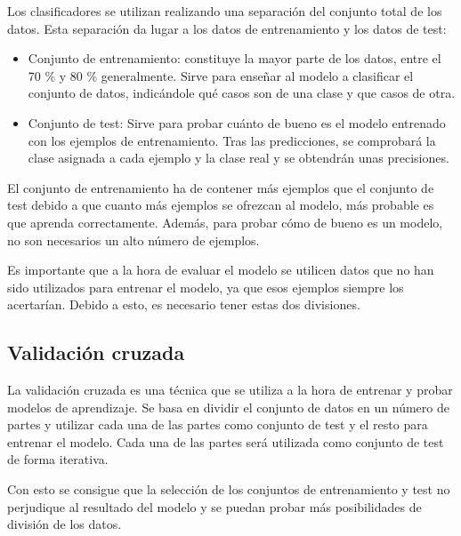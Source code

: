 Los clasificadores se utilizan realizando una separación del conjunto total de los datos. Esta separación da lugar a los datos de entrenamiento y los datos de test:

\begin{itemize}
	\item Conjunto de entrenamiento: constituye la mayor parte de los datos, entre el 70 \% y 80 \% generalmente. Sirve para enseñar al modelo a clasificar el conjunto de datos, indicándole qué casos son de una clase y que casos de otra.
	\item Conjunto de test: Sirve para probar cuánto de bueno es el modelo entrenado con los ejemplos de entrenamiento. Tras las predicciones, se comprobará la clase asignada a cada ejemplo y la clase real y se obtendrán unas precisiones.
\end{itemize}

El conjunto de entrenamiento ha de contener más ejemplos que el conjunto de test debido a que cuanto más ejemplos se ofrezcan al modelo, más probable es que aprenda correctamente. Además, para probar cómo de bueno es un modelo, no son necesarios un alto número de ejemplos.

Es importante que a la hora de evaluar el modelo se utilicen datos que no han sido utilizados para entrenar el modelo, ya que esos ejemplos siempre los acertarían. Debido a esto, es necesario tener estas dos divisiones.

\subsection{Validación cruzada}
La validación cruzada es una técnica que se utiliza a la hora de entrenar y probar modelos de aprendizaje. Se basa en dividir el conjunto de datos en un número de partes y utilizar cada una de las partes como conjunto de test y el resto para entrenar el modelo. Cada una de las partes será utilizada como conjunto de test de forma iterativa.

Con esto se consigue que la selección de los conjuntos de entrenamiento y test no perjudique al resultado del modelo y se puedan probar más posibilidades de división de los datos.

